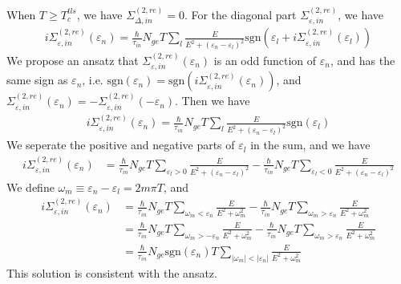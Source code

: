 \documentclass[]{article}
\begin{document}
When $T \geq T_c^{tls}$, we have $\Sigma_{\Delta,in}^{(2,re)} = 0$.
For the diagonal part $\Sigma_{\varepsilon,in}^{(2,re)}$, we have
\begin{align}
    i\Sigma_{\varepsilon,in}^{(2,re)}(\varepsilon_n)
    = \frac{\hbar}{\tau_{in}}N_{ge}T\sum_l\frac{E}{E^2+(\varepsilon_n-\varepsilon_l)^2}
    \text{sgn}\left(\varepsilon_l + i\Sigma_{\varepsilon,in}^{(2,re)}(\varepsilon_l)\right)
\end{align}
We propose an ansatz that $\Sigma_{\varepsilon,in}^{(2,re)}(\varepsilon_n)$
is an odd function of $\varepsilon_n$, and has the same sign as $\varepsilon_n$, i.e.
$\text{sgn}(\varepsilon_n) = \text{sgn}\left(i\Sigma_{\varepsilon,in}^{(2,re)}(\varepsilon_n)\right)$, and
$\Sigma_{\varepsilon,in}^{(2,re)}(\varepsilon_n) = -\Sigma_{\varepsilon,in}^{(2,re)}(-\varepsilon_n)$.
Then we have
\begin{align}
    i\Sigma_{\varepsilon,in}^{(2,re)}(\varepsilon_n)
    = \frac{\hbar}{\tau_{in}}N_{ge}T\sum_l\frac{E}{E^2+(\varepsilon_n-\varepsilon_l)^2}\text{sgn}(\varepsilon_l)
\end{align}
We seperate the positive and negative parts of $\varepsilon_l$ in the sum, and we have
\begin{align}
    i\Sigma_{\varepsilon,in}^{(2,re)}(\varepsilon_n)
    & = \frac{\hbar}{\tau_{in}}N_{ge}T\sum_{\varepsilon_l > 0}\frac{E}{E^2+(\varepsilon_n-\varepsilon_l)^2}
    - \frac{\hbar}{\tau_{in}}N_{ge}T\sum_{\varepsilon_l < 0}\frac{E}{E^2+(\varepsilon_n-\varepsilon_l)^2}
\end{align}
We define $\omega_m \equiv \varepsilon_n - \varepsilon_l = 2m\pi T$, and
\begin{align}
    i\Sigma_{\varepsilon,in}^{(2,re)}(\varepsilon_n)
    & = \frac{\hbar}{\tau_{in}}N_{ge}T\sum_{\omega_m < \varepsilon_n}\frac{E}{E^2+\omega_m^2}
    - \frac{\hbar}{\tau_{in}}N_{ge}T\sum_{\omega_m > \varepsilon_n}\frac{E}{E^2+\omega_m^2}\\
    & = \frac{\hbar}{\tau_{in}}N_{ge}T\sum_{\omega_m > -\varepsilon_n}\frac{E}{E^2+\omega_m^2}
    - \frac{\hbar}{\tau_{in}}N_{ge}T\sum_{\omega_m > \varepsilon_n}\frac{E}{E^2+\omega_m^2}\\
    & = \frac{\hbar}{\tau_{in}}N_{ge}\text{sgn}(\varepsilon_n)T
    \sum_{|\omega_m|<|\varepsilon_n|}\frac{E}{E^2+\omega_m^2}
\end{align}
This solution is consistent with the ansatz.
\end{document}

